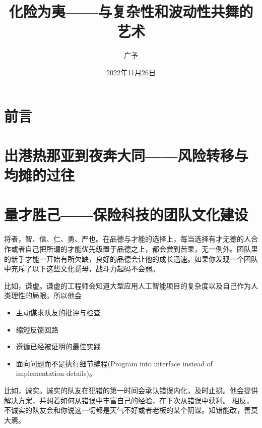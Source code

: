 \documentclass[
  oneside]{book}
\title{化险为夷------与复杂性和波动性共舞的艺术}
\author{广予}
\date{2022年11月26日}
\providecommand{\tightlist}{%
  \setlength{\itemsep}{0pt}\setlength{\parskip}{0pt}}
\begin{document}
\maketitle

{
\setcounter{tocdepth}{1}
\tableofcontents
}
\hypertarget{ux524dux8a00}{%
\chapter*{前言}\label{ux524dux8a00}}

\hypertarget{ux51faux6e2fux70edux90a3ux4e9aux5230ux591cux5954ux5927ux540cux98ceux9669ux8f6cux79fbux4e0eux5747ux644aux7684ux8fc7ux5f80}{%
\chapter{出港热那亚到夜奔大同------风险转移与均摊的过往}\label{ux51faux6e2fux70edux90a3ux4e9aux5230ux591cux5954ux5927ux540cux98ceux9669ux8f6cux79fbux4e0eux5747ux644aux7684ux8fc7ux5f80}}

\hypertarget{ux91cfux624dux80dcux5df1ux4fddux9669ux79d1ux6280ux7684ux56e2ux961fux6587ux5316ux5efaux8bbe}{%
\chapter{量才胜己------保险科技的团队文化建设}\label{ux91cfux624dux80dcux5df1ux4fddux9669ux79d1ux6280ux7684ux56e2ux961fux6587ux5316ux5efaux8bbe}}

将者，智、信、仁、勇、严也。在品德与才能的选择上，每当选择有才无德的人合作或者自己把所谓的才能优先级置于品德之上，都会尝到苦果，无一例外。团队里的新手才能一开始有所欠缺，良好的品德会让他的成长迅速。如果你发现一个团队中充斥了以下这些文化觅母，战斗力起码不会弱。

比如，谦虚。谦虚的工程师会知道大型应用人工智能项目的复杂度以及自己作为人类理性的局限。所以他会

\begin{itemize}
\tightlist
\item
  主动谋求队友的批评与检查
\item
  缩短反馈回路
\item
  遵循已经被证明的最佳实践
\item
  面向问题而不是执行细节编程(Program into interface instead of implementation details)。
\end{itemize}

比如，诚实。诚实的队友在犯错的第一时间会承认错误内化，及时止损。他会提供解决方案，并想着如何从错误中丰富自己的经验，在下次从错误中获利。
相反，不诚实的队友会和你说这一切都是天气不好或者老板的某个阴谋。知错能改，善莫大焉。
\end{document}
